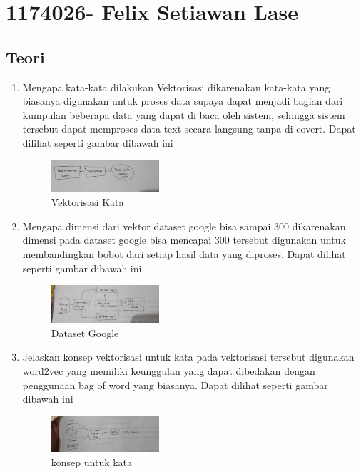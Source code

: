 \section{1174026- Felix Setiawan Lase}
    \subsection{Teori}
    \begin{enumerate}
        \item Mengapa kata-kata dilakukan Vektorisasi
        \subitem dikarenakan kata-kata yang biasanya digunakan untuk proses data supaya dapat menjadi bagian dari kumpulan beberapa data yang dapat di baca oleh sistem, sehingga sistem tersebut dapat memproses data text secara langsung tanpa di covert. Dapat dilihat seperti gambar dibawah ini
        \begin{figure}[H]
            \includegraphics[width=4cm]{figures/1174026/5/teori1.jpeg}
            \centering
            \caption{Vektorisasi Kata}
        \end{figure}
        
        \item Mengapa dimensi dari vektor dataset google bisa sampai 300
        \subitem dikarenakan dimensi pada dataset google bisa mencapai 300 tersebut digunakan untuk membandingkan bobot dari setiap hasil data yang diproses. Dapat dilihat seperti gambar dibawah ini
        \begin{figure}[H]
            \includegraphics[width=4cm]{figures/1174026/5/teori2.jpeg}
            \centering
            \caption{Dataset Google}
        \end{figure}
        
        \item Jelaskan konsep vektorisasi untuk kata
        \subitem pada vektorisasi tersebut digunakan word2vec yang memiliki keunggulan yang dapat dibedakan dengan penggunaan bag of word yang biasanya. Dapat dilihat seperti gambar dibawah ini
        \begin{figure}[H]
            \includegraphics[width=4cm]{figures/1174026/5/teori3.jpeg}
            \centering
            \caption{konsep untuk kata}
        \end{figure}
        

\end{enumerate}
